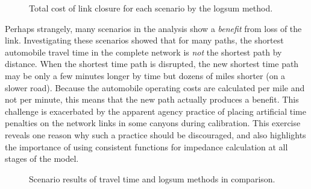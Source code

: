 \documentclass[]{ascelike-new}
\begin{document}
\begin{figure}

\begin{minipage}{\linewidth}



\end{minipage}%
\newline
\begin{minipage}{\linewidth}



\end{minipage}%

\caption{\label{fig-linksmap}Total cost of link closure for each
scenario by the logsum method.}

\end{figure}%

Perhaps strangely, many scenarios in the analysis show a \emph{benefit}
from loss of the link. Investigating these scenarios showed that for
many paths, the shortest automobile travel time in the complete network
is \emph{not} the shortest path by distance. When the shortest time path
is disrupted, the new shortest time path may be only a few minutes
longer by time but dozens of miles shorter (on a slower road). Because
the automobile operating costs are calculated per mile and not per
minute, this means that the new path actually produces a benefit. This
challenge is exacerbated by the apparent agency practice of placing
artificial time penalties on the network links in some canyons during
calibration. This exercise reveals one reason why such a practice should
be discouraged, and also highlights the importance of using consistent
functions for impedance calculation at all stages of the model.

\begin{figure}


\caption{\label{fig-traveltimerank}Scenario results of travel time and
logsum methods in comparison.}

\end{figure}%
\end{document}
